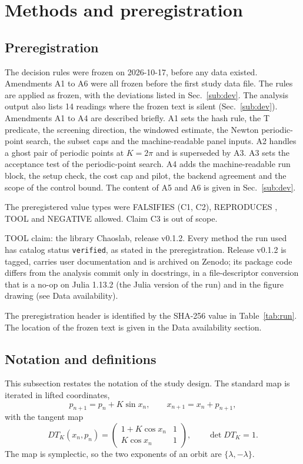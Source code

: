 \documentclass[aip,cha,reprint,amsmath,amssymb,longbibliography]{revtex4-2}
\newcommand{\Sec}[1]{Sec.~\ref{#1}}
\begin{document}
\section{Methods and preregistration}
\label{sec:methods}

\subsection{Preregistration}
\label{sub:prereg}

The decision rules were frozen on 2026-10-17, before any data existed.
Amendments A1 to A6 were all frozen before the first study data file.
The rules are applied as frozen, with the deviations listed in \Sec{sub:dev}.
The analysis output also lists 14 readings where the frozen text is silent (\Sec{sub:dev}).
Amendments A1 to A4 are described briefly.
A1 sets the hash rule, the T predicate, the screening direction, the windowed estimate, the Newton periodic-point search, the subset caps and the machine-readable panel inputs.
A2 handles a ghost pair of periodic points at $K=2\pi$ and is superseded by A3.
A3 sets the acceptance test of the periodic-point search.
A4 adds the machine-readable run block, the setup check, the cost cap and pilot, the backend agreement and the scope of the control bound.
The content of A5 and A6 is given in \Sec{sub:dev}.

The preregistered value types were FALSIFIES (C1, C2), REPRODUCES \cite{SalaArtuso2015}, TOOL and NEGATIVE allowed.
Claim C3 is out of scope.

TOOL claim: the library Chaoslab, release v0.1.2.
Every method the run used has catalog status \texttt{verified}, as stated in the preregistration.
Release v0.1.2 is tagged, carries user documentation and is archived on Zenodo; its package code differs from the analysis commit only in docstrings, in a file-descriptor conversion that is a no-op on Julia 1.13.2 (the Julia version of the run) and in the figure drawing (see Data availability).

The preregistration header is identified by the SHA-256 value in Table~\ref{tab:run}.
The location of the frozen text is given in the Data availability section.

\subsection{Notation and definitions}
\label{sub:notation}

This subsection restates the notation of the study design.
The standard map is iterated in lifted coordinates,
\begin{equation}
p_{n+1}=p_n+K\sin x_n,\qquad x_{n+1}=x_n+p_{n+1},
\label{eq:map}
\end{equation}
with the tangent map
\begin{equation}
DT_K(x_n,p_n)=\begin{pmatrix}1+K\cos x_n & 1\\ K\cos x_n & 1\end{pmatrix},\qquad \det DT_K=1 .
\label{eq:tangent}
\end{equation}
The map is symplectic, so the two exponents of an orbit are $\{\lambda,-\lambda\}$.
\end{document}
